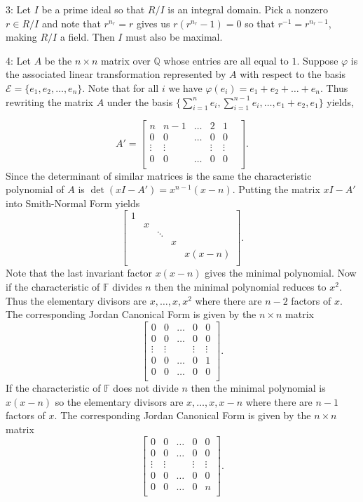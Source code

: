 \documentclass[12pt]{article}
\begin{document}
3: Let $I$ be a prime ideal so that $R/I$ is an integral domain. Pick a nonzero $r \in R/I$ and note that $r^{n_r}=r$ gives us $r(r^{n_r}-1)=0$ so that $r^{-1}=r^{n_r-1}$, making $R/I$ a field. Then $I$ must also be maximal. \newline

4: Let $A$ be the $n \times n$ matrix over $\mathbb{Q}$ whose entries are all equal to $1$.  Suppose $\varphi$ is the associated linear transformation represented by $A$ with respect to the basis $\mathcal{E} = \{e_1, e_2, \ldots, e_n\}$.  Note that for all $i$ we have $\varphi(e_i) = e_1+e_2 + \ldots + e_n$.  Thus rewriting the matrix $A$ under the basis $\{\sum_{i=1}^n e_i,\sum_{i=1}^{n-1} e_i, \ldots, e_1+e_2, e_1\}$ yields,

$$A'= \begin{bmatrix}
n & n-1 & \ldots & 2& 1\\
0 & 0 & \ldots & 0& 0\\
\vdots & \vdots & &\vdots&\vdots &\\
0 & 0 & \ldots & 0&0\\
\end{bmatrix}.$$
Since the determinant of similar matrices is the same the characteristic polynomial of $A$ is $\det (xI-A') = x^{n-1}(x-n)$.  Putting the matrix $xI-A'$ into Smith-Normal Form yields
$$\begin{bmatrix}
1 &  & &  & \\
 & x & & & \\
 & & \ddots &&\\
 &  & & x & \\
 &  & & & x(x-n)\\
\end{bmatrix}.$$
Note that the last invariant factor $x(x-n)$ gives the minimal polynomial.  Now if the characteristic of $\mathbb{F}$ divides $n$ then the minimal polynomial reduces to $x^2$.  Thus the elementary divisors are $x, \ldots, x, x^2$ where there are $n-2$ factors of $x$.  The corresponding Jordan Canonical Form is given by the $n\times n$ matrix
$$\begin{bmatrix}
0 & 0 & \ldots & 0 & 0\\
0 & 0 & \ldots & 0& 0\\
\vdots & \vdots & & \vdots& \vdots\\
0 & 0 & \ldots & 0 & 1\\
0 & 0 & \ldots &0 & 0\\
\end{bmatrix}.$$
If the characteristic of $\mathbb{F}$ does not divide $n$ then the minimal polynomial is $x(x-n)$ so the elementary divisors are $x, \ldots, x,x-n$ where there are $n-1$ factors of $x$.  The corresponding Jordan Canonical Form is given by the $n\times n$ matrix
$$\begin{bmatrix}
0 & 0 & \ldots & 0 & 0\\
0 & 0 & \ldots & 0& 0\\
\vdots & \vdots & & \vdots& \vdots\\
0 & 0 & \ldots & 0 & 0\\
0 & 0 & \ldots &0 & n\\
\end{bmatrix}.$$
\end{document}
